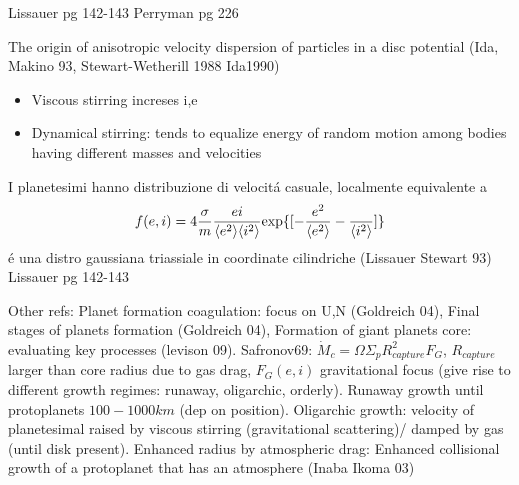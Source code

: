 \begin{workout}[10m-10km, 100km-1000km, 1000km-10000km: refs]
Lissauer pg 142-143
Perryman pg 226
\end{workout}

\begin{workout}
The origin of anisotropic velocity dispersion of particles in a disc potential (Ida, Makino 93, Stewart-Wetherill 1988 Ida1990)
\end{workout}

\begin{workout}
\begin{itemize}
\item Viscous stirring increses i,e
\item Dynamical stirring: tends to equalize energy of random motion among bodies having different masses and velocities
\end{itemize}
\end{workout}

\begin{workout}
I planetesimi hanno distribuzione di velocit\'a casuale, localmente equivalente a
\begin{equation}
f(e,i)=4\frac{\sigma}{m}\frac{ei}{\langle e^2 \rangle\langle i^2 \rangle}\text{exp}\{[-\frac{e^2}{\langle e^2 \rangle}-\frac{}{\langle i^2 \rangle}]\}
\end{equation}
\'e una distro gaussiana triassiale in coordinate cilindriche (Lissauer Stewart 93)
Lissauer pg 142-143
\end{workout}

\begin{workout}
Other refs: Planet formation coagulation: focus on U,N (Goldreich 04), Final stages of planets formation (Goldreich 04), Formation of giant planets core: evaluating key processes (levison 09).
Safronov69: $\dot{M}_c=\Omega\Sigma_pR^2_{capture}F_G$, $R_{capture}$ larger than core radius due to gas drag, $F_G(e,i)$ gravitational focus (give rise to different growth regimes: runaway, oligarchic, orderly).
Runaway growth until protoplanets $100-1000km$ (dep on position).
Oligarchic growth: velocity of planetesimal raised by viscous stirring (gravitational scattering)/ damped by gas (until disk present).
Enhanced radius by atmospheric drag: Enhanced collisional growth of a protoplanet that has an atmosphere (Inaba Ikoma 03)
\end{workout}

